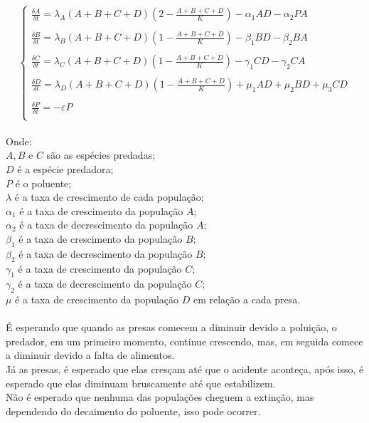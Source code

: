 \documentclass[a4paper]{article}
\begin{document}
\begin{equation}
\left\{\begin{array}{l}
\frac{\delta A}{\delta t} =  \lambda_A (A + B + C + D)(2 - \frac{A + B + C +D}{K}) -\alpha_1AD - \alpha_2PA  \\
\\
\frac{\delta B}{\delta t} =  \lambda_B (A + B + C + D)(1 - \frac{A + B + C +D}{K}) -\beta_1BD - \beta_2BA  \\
\\
\frac{\delta C}{\delta t} =  \lambda_C (A + B + C + D)(1 - \frac{A + B + C +D}{K}) -\gamma_1CD - \gamma_2CA  \\
\\
\frac{\delta D}{\delta t} =  \lambda_D (A + B + C + D)(1 - \frac{A + B + C +D}{K}) + \mu_1AD + \mu_2 BD + \mu_3CD  \\
\\
\frac{\delta P}{\delta t} = - \varepsilon P \\
\end{array}
\end{equation}
\\
Onde:
\\
$A, B$ e $C$ s\~ao as esp\'ecies predadas;
\\
$D$ \'e a esp\'ecie predadora;
\\
$P$ \'e o poluente;
\\
$\lambda$ \'e a taxa de crescimento de cada popula\c{c}\~ao;
\\
$\alpha_1$ \'e a taxa de crescimento da popula\c{c}\~ao $A$;
\\
$\alpha_2$ \'e a taxa de decrescimento da popula\c{c}\~ao $A$;
\\
$\beta_1$ \'e a taxa de crescimento da popula\c{c}\~ao $B$;
\\
$\beta_2$ \'e a taxa de decrescimento da popula\c{c}\~ao $B$;
\\
$\gamma_1$ \'e a taxa de crescimento da popula\c{c}\~ao $C$;
\\
$\gamma_2$ \'e a taxa de decrescimento da popula\c{c}\~ao $C$;
\\
$\mu$ \'e a taxa de crescimento da popula\c{c}\~ao $D$ em rela\c{c}\~ao a cada presa.
\\
\\
\'E esperando que quando as presas comecem a diminuir devido a polui\c{c}\~ao, o predador, em um primeiro momento, continue crescendo, mas, em seguida comece a diminuir devido a falta de alimentos.
\\
J\'a as presas, \'e esperado que elas cres\c{c}am at\'e que o acidente aconte\c{c}a, ap\'os isso, \'e esperado que elas diminuam bruscamente at\'e que estabilizem.
\\
N\~ao \'e esperado que nenhuma das popula\c{c}\~oes cheguem a extin\c{c}\~ao, mas dependendo do decaimento do poluente, isso pode ocorrer.\\
\end{document}

